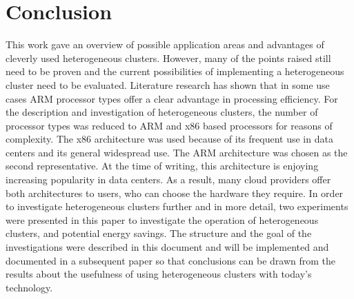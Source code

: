 \section{Conclusion}
This work gave an overview of possible application areas and advantages of cleverly used heterogeneous clusters.  However, many of the points raised still need to be proven and the current possibilities of implementing a heterogeneous cluster need to be evaluated. Literature research has shown that in some use cases ARM processor types offer a clear advantage in processing efficiency. 
For the description and investigation of heterogeneous clusters, the number of processor types was reduced to ARM and x86 based processors for reasons of complexity. The x86 architecture was used because of its frequent use in data centers and its general widespread use. The ARM architecture was chosen as the second representative. At the time of writing, this architecture is enjoying increasing popularity in data centers. As a result, many cloud providers offer both architectures to users, who can choose the hardware they require.
In order to investigate heterogeneous clusters further and in more detail, two experiments were presented in this paper to investigate the operation of heterogeneous clusters, and potential energy savings. 
The structure and the goal of the investigations were described in this document and will be implemented and documented in a subsequent paper so that conclusions can be drawn from the results about the usefulness of using heterogeneous clusters with today's technology.